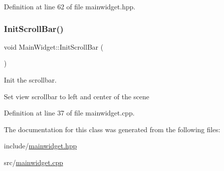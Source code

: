Definition at line 62 of file mainwidget.\+hpp.

\mbox{\label{classMainWidget_af544f3b04a81d63c0810a90706773d3d}} 
\subsubsection{\texorpdfstring{Init\+Scroll\+Bar()}{InitScrollBar()}}
{\footnotesize\ttfamily void Main\+Widget\+::\+Init\+Scroll\+Bar (\begin{DoxyParamCaption}{ }\end{DoxyParamCaption})}



Init the scrollbar. 

Set view scrollbar to left and center of the scene 

Definition at line 37 of file mainwidget.\+cpp.



The documentation for this class was generated from the following files\+:\begin{DoxyCompactItemize}
\item 
include/\mbox{\hyperlink{mainwidget_8hpp}{mainwidget.\+hpp}}\item 
src/\mbox{\hyperlink{mainwidget_8cpp}{mainwidget.\+cpp}}\end{DoxyCompactItemize}
